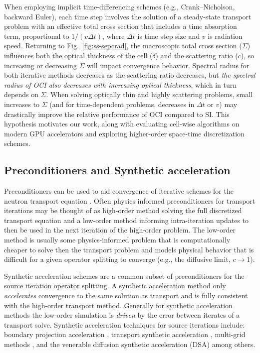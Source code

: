 When employing implicit time-differencing schemes (e.g., Crank--Nicholson, backward Euler), each time step involves the solution of a steady-state transport problem with an effective total cross section that includes a time absorption term, proportional to $1/(v \Delta t)$, where $\Delta t$ is time step size and $v$ is radiation speed.
Returning to Fig.~\ref{fig:ss-sepcrad}, the macroscopic total cross section ($\Sigma$) influences both the optical thickness of the cell ($\delta$) and the scattering ratio ($c$), so increasing or decreasing $\Sigma$ will impact convergence behavior.
Spectral radius for both iterative methods decreases as the scattering ratio decreases, but \textit{the spectral radius of OCI also decreases with increasing optical thickness}, which in turn depends on $\Sigma$.
When solving optically thin and highly scattering problems, small increases to $\Sigma$ (and for time-dependent problems, decreases in $\Delta t$ or $v$) may drastically improve the relative performance of OCI compared to SI.
This hypothesis motivates our work, along with evaluating cell-wise algorithms on modern GPU accelerators and exploring higher-order space-time discretization schemes.

\subsection{Preconditioners and Synthetic acceleration}
\label{c2:precon}
Preconditioners can be used to aid convergence of iterative schemes for the neutron transport equation \cite{adams_fast_2002}.
Often physics informed preconditioners for transport iterations may be thought of as high-order method solving the full discretized transport equation and a low-order method informing intra-iteration updates to then be used in the next iteration of the high-order problem.
The low-order method is usually some physics-informed problem that is computationally cheaper to solve then the transport problem and models physical behavior that is difficult for a given operator splitting to converge (e.g., the diffusive limit, $c\rightarrow1$).

Synthetic acceleration schemes are a common subset of preconditioners for the source iteration operator splitting.
A synthetic acceleration method only \textit{accelerates} convergence to the same solution as transport and is fully consistent with the high-order transport method.
Generally for synthetic acceleration methods the low-order simulation is \textit{driven} by the error between iterates of a transport solve.
Synthetic acceleration techniques for source iterations include:
boundary projection acceleration \cite{adams_boundary_1988}, 
transport synthetic acceleration \cite{ramone_1997_tsa},
multi-grid methods \cite{man1994parallel},
and the venerable diffusion synthetic acceleration (DSA) \cite{larsen_1983_dsaforsn} among others.

